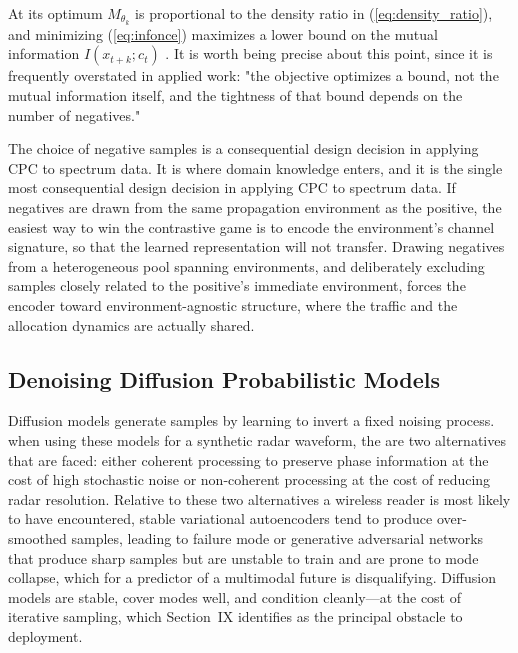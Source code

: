 \documentclass[lettersize,journal]{IEEEtran}
\begin{document}
At its optimum $M_{\theta_k}$ is proportional to the
density ratio in (\ref{eq:density_ratio}), and minimizing
(\ref{eq:infonce}) maximizes a lower bound on the mutual information
$I(x_{t+k}; c_t)$ \cite{Oord2018}.
It is worth being precise about this point, since it is frequently 
overstated in applied work: "the objective
optimizes a bound, not the mutual information itself, and the tightness
of that bound depends on the number of negatives."

The choice of negative samples is a consequential design decision in applying
CPC to spectrum data.
It is where domain knowledge enters, and it is the
single most consequential design decision in applying CPC to spectrum
data.
If negatives are drawn from the same propagation environment as
the positive, the easiest way to win the contrastive game is to encode
the environment's channel signature, so that the learned representation will
not transfer.
Drawing negatives from a heterogeneous pool spanning
environments, and deliberately excluding samples closely related to the
positive's immediate environment, forces the encoder toward
environment-agnostic structure, where the traffic and the allocation dynamics
 are actually shared.

\subsection{\textbf{Denoising Diffusion Probabilistic Models}}
Diffusion models \cite{SohlDickstein2015, Ho2020} generate samples 
by learning to invert a fixed noising process.
when using these models for a synthetic radar waveform, 
the are two alternatives that are faced: either coherent processing to 
preserve phase information at the cost of high stochastic noise or
non-coherent processing at the cost of reducing radar resolution.
 Relative to these two alternatives a wireless reader is most likely to
have encountered, stable variational autoencoders
\cite{Kingma2014} tend to produce over-smoothed samples,
leading to failure mode or generative
adversarial networks \cite{Goodfellow2014} that produce sharp samples but are
unstable to train and are prone to mode collapse, which for a predictor of a
multimodal future is disqualifying.
Diffusion models are stable, cover modes well,
and condition cleanly---at the cost of iterative sampling, which
Section~IX identifies as the principal obstacle to deployment.

\end{document}
